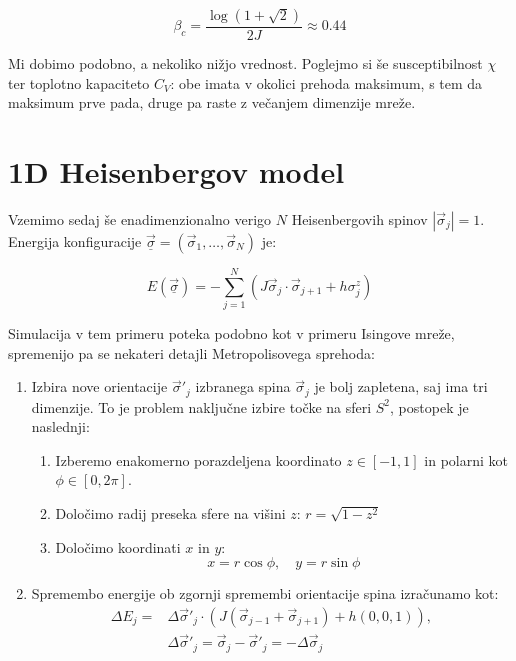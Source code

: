 \documentclass[a4paper]{article}
\newcommand{\s}{\sigma}
\newcommand{\vs}{\vec{\s}}
\newcommand{\uvs}{\underline{\vs}}
\newcommand{\D}{\Delta}
\begin{document}
    \begin{equation}\label{eq9}
        \beta_c = \frac{\log(1 + \sqrt{2})}{2J} \approx 0.44
    \end{equation}

    Mi dobimo podobno, a nekoliko nižjo vrednost.
    Poglejmo si še susceptibilnost $\chi$ ter toplotno kapaciteto $C_V$: obe imata v okolici prehoda maksimum, s tem da
    maksimum prve pada, druge pa raste z večanjem dimenzije mreže.

    \section{1D Heisenbergov model}

    Vzemimo sedaj še enadimenzionalno verigo $N$ Heisenbergovih spinov $|\vs_j| = 1$.
    Energija konfiguracije $\uvs = (\vs_1, \ldots, \vs_N)$ je:

    \begin{equation}\label{eq10}
        E(\uvs) = -\sum_{j=1}^N (J \vs_j \cdot \vs_{j+1} + h\s_j^z)
    \end{equation}

    Simulacija v tem primeru poteka podobno kot v primeru Isingove mreže, spremenijo pa se nekateri detajli
    Metropolisovega sprehoda:

    \begin{enumerate}
        \item Izbira nove orientacije $\vs'_j$ izbranega spina $\vs_j$ je bolj zapletena, saj ima tri dimenzije.
        To je problem naključne izbire točke na sferi $S^2$, postopek je naslednji:
        \begin{enumerate}
            \item Izberemo enakomerno porazdeljena koordinato $z \in [-1, 1]$ in polarni kot $\phi \in [0, 2\pi]$.
            \item Določimo radij preseka sfere na višini $z$: $r = \sqrt{1 - z^2}$
            \item Določimo koordinati $x$ in $y$:
            \begin{equation}\label{eq11}
                x = r\cos{\phi}, \quad y = r\sin{\phi}
            \end{equation}
        \end{enumerate}
        \item Spremembo energije ob zgornji spremembi orientacije spina izračunamo kot:
        \begin{equation}\label{eq12}
            \begin{split}
                \D E_j = &\D \vs'_j \cdot \left( J(\vs_{j-1} + \vs_{j+1}) + h(0, 0, 1) \right), \\
                &\D \vs'_j = \vs_j - \vs'_j = -\D \vs_j
            \end{split}
        \end{equation}
    \end{enumerate}
\end{document}
